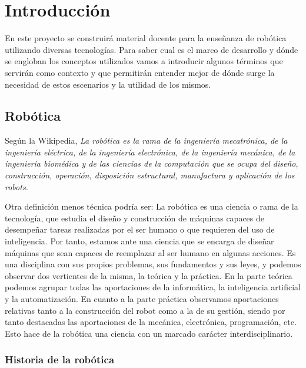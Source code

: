 \chapter{Introducción}
\label{ch:Introduccion}

En este proyecto se construirá material docente para la enseñanza de robótica utilizando diversas tecnologías. Para saber cual es el marco de desarrollo y dónde se engloban los conceptos utilizados vamos a introducir algunos términos que servirán como contexto y que permitirán entender mejor de dónde surge la necesidad de estos escenarios y la utilidad de los mismos.

\section{Robótica}
\label{sec:intr_robotica}

Según la Wikipedia\cite{wikipedia}, \textit{La robótica es la rama de la ingeniería mecatrónica, de la ingeniería eléctrica, de la ingeniería electrónica, de la ingeniería mecánica, de la ingeniería biomédica y de las ciencias de la computación que se ocupa del diseño, construcción, operación, disposición estructural, manufactura y aplicación de los robots.}

Otra definición menos técnica podría ser: La robótica es una ciencia o rama de la tecnología, que estudia el diseño y construcción de máquinas capaces de desempeñar tareas realizadas por el ser humano o que requieren del uso de inteligencia. Por tanto, estamos ante una ciencia que se encarga de diseñar máquinas que sean capaces de reemplazar al ser humano en algunas acciones. Es una disciplina con sus propios problemas, sus fundamentos y sus leyes, y podemos observar dos vertientes de la misma, la teórica y la práctica. En la parte teórica podemos agrupar todas las aportaciones de la informática, la inteligencia artificial y la automatización. En cuanto a la parte práctica observamos aportaciones relativas tanto a la construcción del robot como a la de su gestión, siendo por tanto destacadas las aportaciones de la mecánica, electrónica, programación, etc. Esto hace de la robótica una ciencia con un marcado carácter interdisciplinario.

\subsection{Historia de la robótica}
\label{subsec:intr_historiarobotica}

